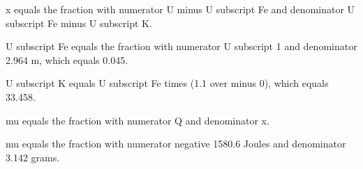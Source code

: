 x equals the fraction with numerator U minus U subscript Fe and denominator U subscript Fe minus U subscript K.

U subscript Fe equals the fraction with numerator U subscript 1 and denominator 2.964 m, which equals 0.045.

U subscript K equals U subscript Fe times (1.1 over minus 0), which equals 33.458.

mu equals the fraction with numerator Q and denominator x.

mu equals the fraction with numerator negative 1580.6 Joules and denominator 3.142 grams.